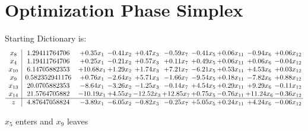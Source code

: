 \documentclass[9pt]{article}
\begin{document}
\section{Optimization Phase Simplex}
Starting Dictionary is:
\[\begin{array}{c| c c@{\hskip 2pt} c@{\hskip 2pt} c@{\hskip 2pt} c@{\hskip 2pt} c@{\hskip 2pt} c@{\hskip 2pt} c@{\hskip 2pt} c@{\hskip 2pt} }
 x_{8}   &  1.29411764706 & +  0.35 x_{1} & -0.41 x_{2} & +  0.47 x_{3} & -0.59 x_{7} & -0.41 x_{5} & +  0.06 x_{11} & -0.94 x_{6} & +  0.06 x_{12}\\
 x_{4}   &  1.19411764706 & +  0.25 x_{1} & -0.21 x_{2} & +  0.57 x_{3} & +  0.11 x_{7} & +  0.49 x_{5} & +  0.06 x_{11} & +  0.06 x_{6} & -0.04 x_{12}\\
 x_{10}   &  6.14705882353 & + 10.68 x_{1} & +  1.29 x_{2} & +  1.74 x_{3} & +  7.21 x_{7} & -6.21 x_{5} & +  0.53 x_{11} & +  4.53 x_{6} & +  0.03 x_{12}\\
 x_{9}   &  0.582352941176 & +  0.76 x_{1} & -2.64 x_{2} & +  5.71 x_{3} & -1.66 x_{7} & -9.54 x_{5} & +  0.18 x_{11} & -7.82 x_{6} & +  0.88 x_{12}\\
 x_{13}   &  20.0705882353 & -8.64 x_{1} & -3.26 x_{2} & -1.25 x_{3} & -0.14 x_{7} & +  4.54 x_{5} & +  0.29 x_{11} & +  9.29 x_{6} & -0.11 x_{12}\\
 x_{14}   &  21.5764705882 & -10.19 x_{1} & +  4.55 x_{2} & -12.52 x_{3} & + 12.85 x_{7} & +  0.75 x_{5} & -0.76 x_{11} & + 11.24 x_{6} & -0.36 x_{12}\\
\hline
z    &  4.87647058824 & -3.89 x_{1} & -6.05 x_{2} & -0.82 x_{3} & -0.25 x_{7} & +  5.05 x_{5} & +  0.24 x_{11} & +  4.24 x_{6} & -0.06 x_{12}\\
\end{array}\]


 $ x_{5} $ enters and $ x_{9} $ leaves 
\end{document}
